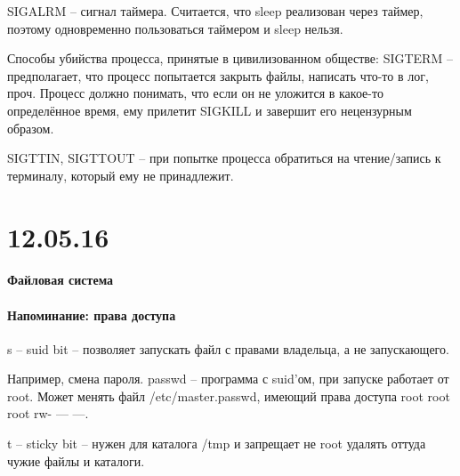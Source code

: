 \documentclass[a4paper,10pt]{article}
\begin{document}
SIGALRM -- сигнал таймера. Считается, что sleep реализован через таймер, поэтому одновременно пользоваться таймером и sleep нельзя.

Способы убийства процесса, принятые в цивилизованном обществе:
SIGTERM -- предполагает, что процесс попытается закрыть файлы, написать что-то в лог, проч. Процесс должно понимать, что если он не уложится в какое-то определённое время, ему прилетит SIGKILL и завершит его нецензурным образом.

SIGTTIN, SIGTTOUT -- при попытке процесса обратиться на чтение/запись к терминалу, который ему не принадлежит.

\section{12.05.16}
\paragraph{Файловая система}

\paragraph{Напоминание: права доступа}

s -- suid bit -- позволяет запускать файл с правами владельца, а не запускающего.

Например, смена пароля. passwd -- программа с suid'ом, при запуске работает от root. Может менять файл /etc/master.passwd, имеющий права доступа root root root rw- --- ---.

t -- sticky bit -- нужен для каталога /tmp и запрещает не root удалять оттуда чужие файлы и каталоги.
\end{document}
